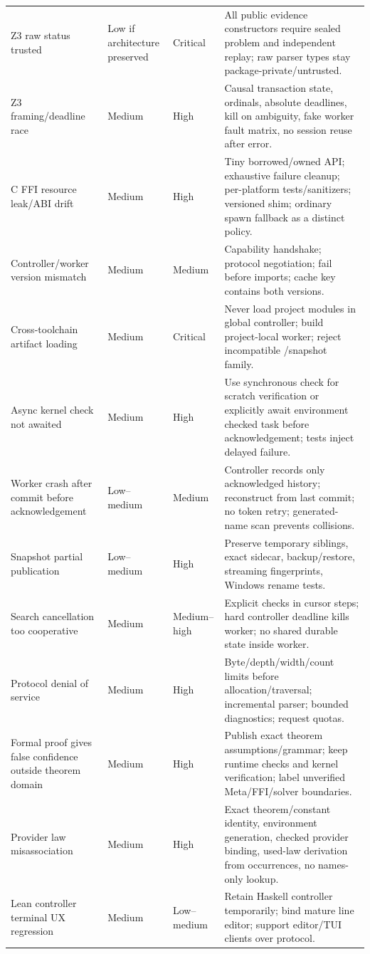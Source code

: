\documentclass[10pt,letterpaper,oneside]{report}
\newcommand{\code}[1]{\texttt{\detokenize{#1}}}
\begin{document}
\begin{longtable}{@{}L{0.21\textwidth}C{0.09\textwidth}C{0.09\textwidth}L{0.51\textwidth}@{}}
Z3 raw status trusted & Low if architecture preserved & Critical & All public evidence constructors require sealed problem and independent replay; raw parser types stay package-private/untrusted. \\
Z3 framing/deadline race & Medium & High & Causal transaction state, ordinals, absolute deadlines, kill on ambiguity, fake worker fault matrix, no session reuse after error. \\
C FFI resource leak/ABI drift & Medium & High & Tiny borrowed/owned API; exhaustive failure cleanup; per-platform tests/sanitizers; versioned shim; ordinary spawn fallback as a distinct policy. \\
Controller/worker version mismatch & Medium & Medium & Capability handshake; protocol negotiation; fail before imports; cache key contains both versions. \\
Cross-toolchain artifact loading & Medium & Critical & Never load project modules in global controller; build project-local worker; reject incompatible \code{.olean}/snapshot family. \\
Async kernel check not awaited & Medium & High & Use synchronous check for scratch verification or explicitly await environment checked task before acknowledgement; tests inject delayed failure. \\
Worker crash after commit before acknowledgement & Low--medium & Medium & Controller records only acknowledged history; reconstruct from last commit; no token retry; generated-name scan prevents collisions. \\
Snapshot partial publication & Low--medium & High & Preserve temporary siblings, exact sidecar, backup/restore, streaming fingerprints, Windows rename tests. \\
Search cancellation too cooperative & Medium & Medium--high & Explicit checks in cursor steps; hard controller deadline kills worker; no shared durable state inside worker. \\
Protocol denial of service & Medium & High & Byte/depth/width/count limits before allocation/traversal; incremental parser; bounded diagnostics; request quotas. \\
Formal proof gives false confidence outside theorem domain & Medium & High & Publish exact theorem assumptions/grammar; keep runtime checks and kernel verification; label unverified Meta/FFI/solver boundaries. \\
Provider law misassociation & Medium & High & Exact theorem/constant identity, environment generation, checked provider binding, used-law derivation from occurrences, no names-only lookup. \\
Lean controller terminal UX regression & Medium & Low--medium & Retain Haskell controller temporarily; bind mature line editor; support editor/TUI clients over protocol. \\
\bottomrule
\end{longtable}
\end{document}
